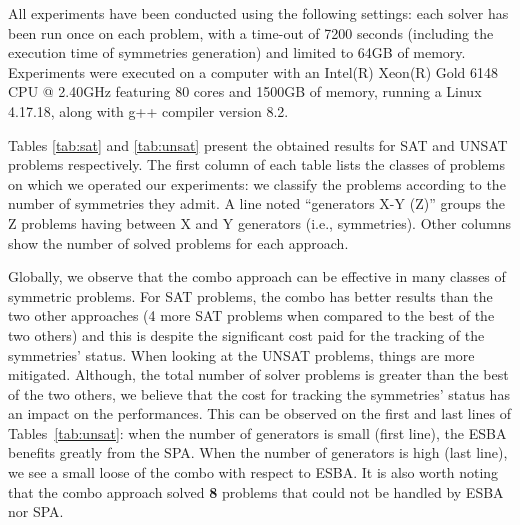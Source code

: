 All experiments have been conducted using the following settings: each solver
has been run once on each problem, with a time-out of 7200 seconds (including
the execution time of symmetries generation) and limited to 64GB of memory.
Experiments were executed on a computer with an Intel(R) Xeon(R) Gold 6148 CPU
@ 2.40GHz featuring 80 cores and 1500GB of memory, running a Linux 4.17.18,
along with g++ compiler version 8.2.

Tables \ref{tab:sat} and \ref{tab:unsat} present the obtained results for SAT
and UNSAT problems respectively. The first column of each table lists the
classes of problems on which we operated our experiments: we classify the
problems according to the number of symmetries they admit. A line noted
``generators X-Y (Z)'' groups the Z problems having between X and Y generators
(i.e., symmetries). Other columns show the number of solved problems for each
approach.

Globally, we observe that the combo approach can be effective in many classes
of symmetric problems. For SAT problems, the combo has better results than the
two other approaches (4 more SAT problems when compared to the best of the two
others) and this is despite the significant cost paid for the tracking of the
symmetries' status. When looking at the UNSAT problems, things are more
mitigated. Although, the total number of solver problems is greater than the
best of the two others, we believe that the cost for tracking the symmetries'
status has an impact on the performances. This can be observed on the first and
last lines of Tables~\ref{tab:unsat}: when the number of generators is small
(first line), the ESBA benefits greatly from the SPA. When the number of
generators is high (last line), we see a small loose of the combo with respect
to ESBA. It is also worth noting that the combo approach solved \textbf{8} problems 
that could not be handled by ESBA nor SPA.



\begin{table}[!htbp]
	\begin{center}
	\end{center}
	\caption{Comparison of PAR-2 and CTI times (in seconds) of the global solving.}
	\label{tab:global}
\end{table}

